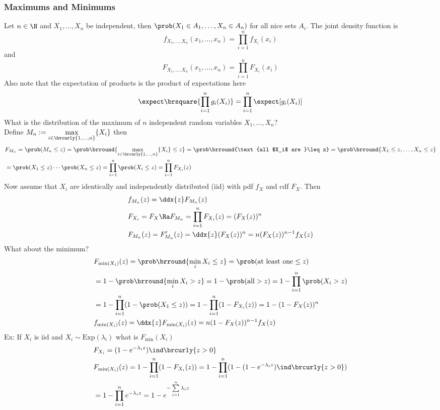 \subsubsection{Maximums and Minimums}
Let $n\in\N$ and $X_1,\ldots,X_n$ be independent, then $\prob(X_1\in A_1,\ldots,X_n\in A_n)$ for all nice sets $A_i$. The joint density function is
\[f_{X_1,\ldots,X_n}(x_1,\ldots,x_n)=\prod_{i=1}^n f_{X_i}(x_i)\]
and
\[F_{X_1,\ldots,X_n}(x_1,\ldots,x_n)=\prod_{i=1}^n F_{X_i}(x_i)\]
Also note that the expectation of products is the product of expectations here
\[\expect\brsquare{\prod_{i=1}^n g_i(X_i)}=\prod_{i=1}^n\expect[g_i(X_i)]\]
What is the distribution of the maximum of $n$ independent random variables $X_1,\ldots,X_n$?\\
Define $M_n:=\max\limits_{i\in\brcurly{1,\ldots,n}}\{X_i\}$ then
\begin{align*}
    &F_{M_n}=\prob(M_n\leq z)=\prob\brround{\max_{i\in\brcurly{1,\ldots,n}}\{X_i\}\leq z}=\prob\brround{\text{all $X_i$ are }\leq z}=\prob\brround{X_1\leq z,\ldots,X_n\leq z}\\
    &=\prob(X_1\leq z)\cdots\prob(X_n\leq z)=\prod_{i=1}^n \prob(X_i\leq z)=\prod_{i=1}^n F_{X_i}(z)
\end{align*}
Now assume that $X_i$ are identically and independently distributed (iid) with pdf $f_X$ and cdf $F_X$. Then
\begin{align*}
    &f_{M_n}(z)=\ddx{z} F_{M_n}(z)\\
    &F_{X_i}=F_X\Ra F_{M_n}=\prod_{i=1}^n F_{X_i}(z)=(F_X(z))^n\\
    &F_{M_n}(z)=F'_{M_n}(z)=\ddx{z}(F_X(z))^n=n(F_X(z))^{n-1}f_X(z)
\end{align*}
What about the minimum?\\
\begin{align*}
    &F_{\min(X_i)}(z)=\prob\brround{\min_{i}X_i\leq z}=\prob(\text{at least one}\leq z)\\
    &=1-\prob\brround{\min_{i}X_i>z}=1-\prob(\text{all}>z)=1-\prod_{i=1}^n\prob(X_i>z)\\
    &=1-\prod_{i=1}^n(1-\prob(X_1\leq z))=1-\prod_{i=1}^n(1-F_{X_i}(z))=1-(1-F_X(z))^n\\
    &f_{\min(X_i)}(z)=\ddx{z}F_{\min(X_i)}(z)=n(1-F_X(z))^{n-1}f_X(z)
\end{align*}
Ex: If $X_i$ is iid and $X_i\sim\mathrm{Exp}(\lambda_i)$ what is $F_{\min}(X_i)$
\begin{align*}
    &F_{X_i}=(1-e^{-\lambda_i z})\ind\brcurly{z>0}\\
    &F_{\min(X_i)}(z)=1-\prod_{i=1}^n(1-F_{X_i}(z))=1-\prod_{i=1}^n(1-(1-e^{-\lambda_i z})\ind\brcurly{z>0})\\
    &=1-\prod_{i=1}^n e^{-\lambda_i z}=1-e^{-\sum\limits_{i=1}^n\lambda_i z}
\end{align*}

